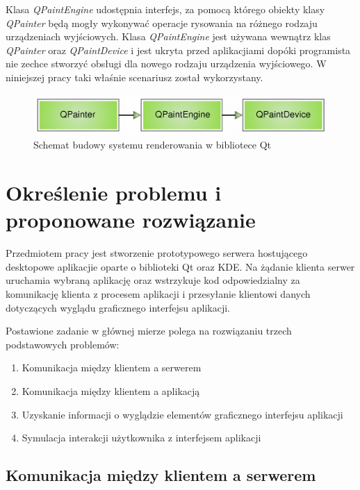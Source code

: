 \documentclass[polish]{inz}
\begin{document}
Klasa \emph{QPaintEngine} udostępnia interfejs, za pomocą którego obiekty klasy \emph{QPainter} będą mogły wykonywać operacje rysowania na różnego rodzaju urządzeniach wyjściowych. Klasa \emph{QPaintEngine} jest używana wewnątrz klas \emph{QPainter} oraz \emph{QPaintDevice} i jest ukryta przed aplikacjiami dopóki programista nie zechce stworzyć obsługi dla nowego rodzaju urządzenia wyjściowego. W niniejszej pracy taki właśnie scenariusz został wykorzystany.
 
\begin{figure}[!h]
  \centering
  \includegraphics[width=\textwidth,height=!]{img/paintsystem-core.png}
  \caption{Schemat budowy systemu renderowania w bibliotece Qt}
  \label{paintsystem-core}
\end{figure}

\chapter{Określenie problemu i proponowane rozwiązanie}

Przedmiotem pracy jest stworzenie prototypowego serwera hostującego desktopowe aplikacjie oparte o biblioteki Qt oraz KDE. Na żądanie klienta serwer uruchamia wybraną aplikację oraz wstrzykuje kod odpowiedzialny za komunikację klienta z procesem aplikacji i przesyłanie klientowi danych dotyczących wyglądu graficznego interfejsu aplikacji. 

Postawione zadanie w głównej mierze polega na rozwiązaniu trzech podstawowych problemów:
\begin{enumerate}
  \item Komunikacja między klientem a serwerem
  \item Komunikacja między klientem a aplikacją
  \item Uzyskanie informacji o wyglądzie elementów graficznego interfejsu aplikacji
  \item Symulacja interakcji użytkownika z interfejsem aplikacji
\end{enumerate}

\section{Komunikacja między klientem a serwerem}
\end{document}

